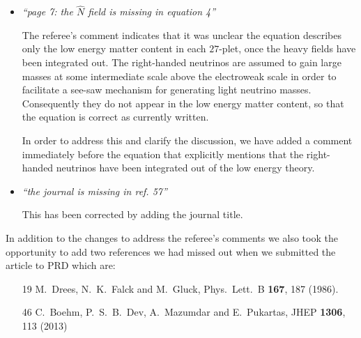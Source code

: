 \documentclass[12pt]{article}
\begin{document}
\begin{itemize}
\item {\it ``page 7: the $\hat N$ field is missing in equation 4''}

The referee's comment indicates that it was unclear the equation describes
only the low energy matter content in each $27$-plet, once the heavy fields
have been integrated out. The right-handed neutrinos are assumed to gain
large masses at some intermediate scale above the electroweak scale in order
to facilitate a see-saw mechanism for generating light neutrino masses.
Consequently they do not appear in the low energy matter content, so that
the equation is correct as currently written.

In order to address this and clarify the discussion, we have added a comment
immediately before the equation that explicitly mentions that the right-handed
neutrinos have been integrated out of the low energy theory.

\item {\it ``the journal is missing in ref. 57''}

This has been corrected by adding the journal title.


\end{itemize}

In addition to the changes to address the referee's comments we also took the
opportunity to add two references we had missed out when we submitted the
article to PRD which are:
\begin{itemize}
\item [19]  M.~Drees, N.~K.~Falck and M.~Gluck, Phys.\ Lett.\ B {\bf 167},
187 (1986).
\item [46]  C.~Boehm, P.~S.~B.~Dev, A.~Mazumdar and E.~Pukartas, JHEP
{\bf 1306}, 113 (2013)
\end{itemize}
\end{document}
